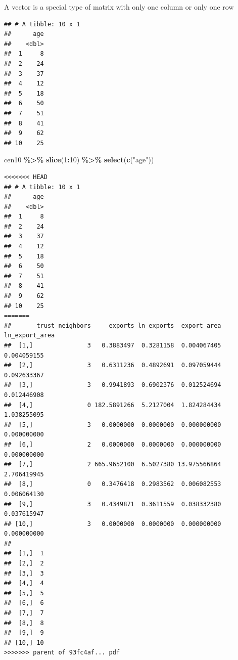 \documentclass[]{book}
\newenvironment{Shaded}{\begin{snugshade}}{\end{snugshade}}
\newcommand{\CommentTok}[1]{\textcolor[rgb]{0.56,0.35,0.01}{\textit{#1}}}
\newcommand{\DecValTok}[1]{\textcolor[rgb]{0.00,0.00,0.81}{#1}}
\newcommand{\KeywordTok}[1]{\textcolor[rgb]{0.13,0.29,0.53}{\textbf{#1}}}
\newcommand{\NormalTok}[1]{#1}
\newcommand{\OperatorTok}[1]{\textcolor[rgb]{0.81,0.36,0.00}{\textbf{#1}}}
\newcommand{\StringTok}[1]{\textcolor[rgb]{0.31,0.60,0.02}{#1}}
\theoremstyle{definition}
\theoremstyle{definition}
\theoremstyle{definition}
\theoremstyle{remark}
\begin{document}
\begin{Shaded}
\begin{Highlighting}[]
\begin{Shaded}
\begin{Highlighting}[]
A vector is a special type of matrix with only one column or only one row

\begin{Shaded}
\end{Shaded}

\begin{verbatim}
## # A tibble: 10 x 1
##      age
##    <dbl>
##  1     8
##  2    24
##  3    37
##  4    12
##  5    18
##  6    50
##  7    51
##  8    41
##  9    62
## 10    25
\end{verbatim}

\begin{Shaded}
\begin{Highlighting}[]
\NormalTok{cen10 }\OperatorTok{\%>\%}\StringTok{ }\KeywordTok{slice}\NormalTok{(}\DecValTok{1}\OperatorTok{:}\DecValTok{10}\NormalTok{) }\OperatorTok{\%>\%}\StringTok{ }\KeywordTok{select}\NormalTok{(}\KeywordTok{c}\NormalTok{(}\StringTok{"age"}\NormalTok{))}
\end{Highlighting}
\end{Shaded}

\begin{verbatim}
<<<<<<< HEAD
## # A tibble: 10 x 1
##      age
##    <dbl>
##  1     8
##  2    24
##  3    37
##  4    12
##  5    18
##  6    50
##  7    51
##  8    41
##  9    62
## 10    25
=======
##       trust_neighbors     exports ln_exports  export_area ln_export_area
##  [1,]               3   0.3883497  0.3281158  0.004067405    0.004059155
##  [2,]               3   0.6311236  0.4892691  0.097059444    0.092633367
##  [3,]               3   0.9941893  0.6902376  0.012524694    0.012446908
##  [4,]               0 182.5891266  5.2127004  1.824284434    1.038255095
##  [5,]               3   0.0000000  0.0000000  0.000000000    0.000000000
##  [6,]               2   0.0000000  0.0000000  0.000000000    0.000000000
##  [7,]               2 665.9652100  6.5027380 13.975566864    2.706419945
##  [8,]               0   0.3476418  0.2983562  0.006082553    0.006064130
##  [9,]               3   0.4349871  0.3611559  0.038332380    0.037615947
## [10,]               3   0.0000000  0.0000000  0.000000000    0.000000000
##         
##  [1,]  1
##  [2,]  2
##  [3,]  3
##  [4,]  4
##  [5,]  5
##  [6,]  6
##  [7,]  7
##  [8,]  8
##  [9,]  9
## [10,] 10
>>>>>>> parent of 93fc4af... pdf
\end{verbatim}


\end{Highlighting}
\end{Shaded}
\end{Highlighting}
\end{Shaded}
\end{document}
